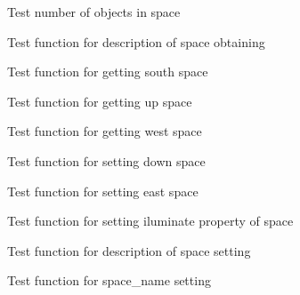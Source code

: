 \begin{DoxyRefList}
\item[\label{test__test000127}%
\hypertarget{test__test000127}{}%
Global \hyperlink{space__test_8c_a07d793d51acfebb4d3261cafbbf35a4b}{test1\+\_\+space\+\_\+get\+\_\+object\+\_\+number} ()]Test number of objects in space  
\item[\label{test__test000138}%
\hypertarget{test__test000138}{}%
Global \hyperlink{space__test_8c_ace49b6853779ebcd4d4d403e73ad6cda}{test1\+\_\+space\+\_\+get\+\_\+short\+\_\+description} ()]Test function for description of space obtaining  
\item[\label{test__test000156}%
\hypertarget{test__test000156}{}%
Global \hyperlink{space__test_8c_a8e345065f58565e131bdb3a9d0096ed5}{test1\+\_\+space\+\_\+get\+\_\+south} ()]Test function for getting south space  
\item[\label{test__test000175}%
\hypertarget{test__test000175}{}%
Global \hyperlink{space__test_8c_a27def98869466837b2b9e46c8979b795}{test1\+\_\+space\+\_\+get\+\_\+up} ()]Test function for getting up space  
\item[\label{test__test000166}%
\hypertarget{test__test000166}{}%
Global \hyperlink{space__test_8c_a1f08c6866885bfc093717f57b1b86539}{test1\+\_\+space\+\_\+get\+\_\+west} ()]Test function for getting west space  
\item[\label{test__test000177}%
\hypertarget{test__test000177}{}%
Global \hyperlink{space__test_8c_acfdc180b8543b1fd7e320423416a7eec}{test1\+\_\+space\+\_\+set\+\_\+down} ()]Test function for setting down space  
\item[\label{test__test000158}%
\hypertarget{test__test000158}{}%
Global \hyperlink{space__test_8c_ab1f093af4be3ca8e525d0517cc846f47}{test1\+\_\+space\+\_\+set\+\_\+east} ()]Test function for setting east space  
\item[\label{test__test000170}%
\hypertarget{test__test000170}{}%
Global \hyperlink{space__test_8c_af91f2dc174c3e15c5db66317f1c1a25d}{test1\+\_\+space\+\_\+set\+\_\+iluminate} ()]Test function for setting iluminate property of space  
\item[\label{test__test000140}%
\hypertarget{test__test000140}{}%
Global \hyperlink{space__test_8c_a5eac430f7edc2c3c762186580bf2f7cb}{test1\+\_\+space\+\_\+set\+\_\+long\+\_\+description} ()]Test function for description of space setting  
\item[\label{test__test000130}%
\hypertarget{test__test000130}{}%
Global \hyperlink{space__test_8c_a2569bab6cfeec15f722d232bb8c78c9e}{test1\+\_\+space\+\_\+set\+\_\+name} ()]Test function for space\+\_\+name setting  

\end{DoxyRefList}
